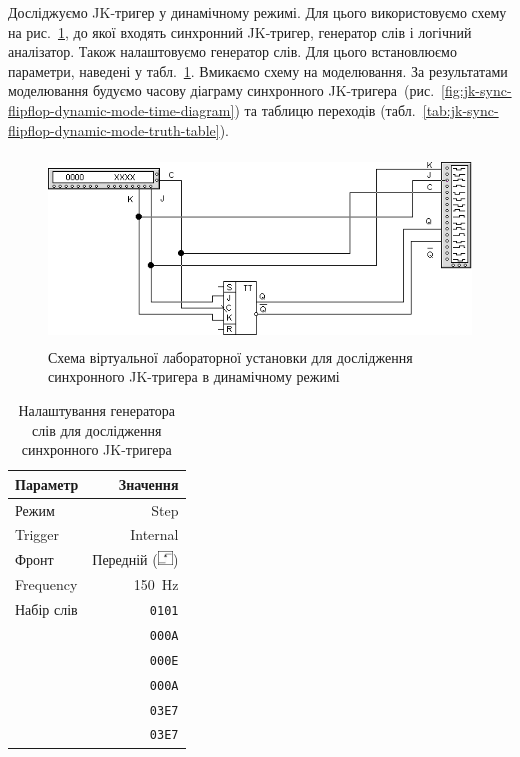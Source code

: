 \documentclass[a4paper,oneside,DIV=10,12pt]{scrartcl}
\newcommand\hexword[1]{\texttt{#1}}
\begin{document}
			Досліджуємо JK-тригер у динамічному режимі. Для цього використовуємо схему на рис.~\ref{fig:jk-sync-flipflop-dynamic-mode-schematic}, до якої входять синхронний JK-тригер, генератор слів і логічний аналізатор. Також налаштовуємо генератор слів. Для цього встановлюємо параметри, наведені у табл.~\ref{tab:jk-sync-flipflop-word-generator-settings}. Вмикаємо схему на моделювання. За результатами моделювання будуємо часову діаграму синхронного JK-тригера~(рис.~\ref{fig:jk-sync-flipflop-dynamic-mode-time-diagram}) та таблицю переходів (табл.~\ref{tab:jk-sync-flipflop-dynamic-mode-truth-table}).
			
			\begin{figure}[!htbp]
			\centering
				\includegraphics[height = 50mm]{assets/03-02-jk-flipflop-dynamic-mode-schematic.png}
			\caption{Схема віртуальної лабораторної установки для дослідження синхронного JK-тригера в динамічному режимі}
			\label{fig:jk-sync-flipflop-dynamic-mode-schematic}
			\end{figure}
			
			\begin{table}[!htbp]
			\centering
				\begin{tabular}{lr}
					\toprule
						Параметр & Значення\\
					\midrule
						Режим & Step\\
						Trigger & Internal\\
						Фронт & Передній (\includegraphics[height=1em]{assets/front-setting-button.png})\\
						Frequency & 150~Hz\\
						Набір слів & \hexword{0101}\\
						           & \hexword{000A}\\
						           & \hexword{000E}\\
						           & \hexword{000A}\\
						           & \hexword{03E7}\\
						           & \hexword{03E7}\\
					\bottomrule
				\end{tabular}
			\caption{Налаштування генератора слів для дослідження синхронного JK-тригера}
			\label{tab:jk-sync-flipflop-word-generator-settings}
			\end{table}
			
\end{document}
